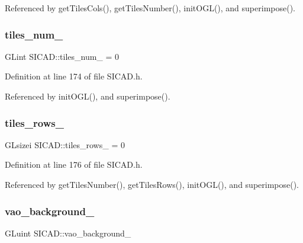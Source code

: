Referenced by get\+Tiles\+Cols(), get\+Tiles\+Number(), init\+O\+G\+L(), and superimpose().

\mbox{\label{classSICAD_a68723ee57cc9a1e02bc0dbda54a584ff}} 
\subsubsection{\texorpdfstring{tiles\+\_\+num\+\_\+}{tiles\_num\_}}
{\footnotesize\ttfamily G\+Lint S\+I\+C\+A\+D\+::tiles\+\_\+num\+\_\+ = 0\hspace{0.3cm}{\ttfamily [private]}}



Definition at line 174 of file S\+I\+C\+A\+D.\+h.



Referenced by init\+O\+G\+L(), and superimpose().

\mbox{\label{classSICAD_aca3efa8f3fb75b3ee02474d4ec00e49e}} 
\subsubsection{\texorpdfstring{tiles\+\_\+rows\+\_\+}{tiles\_rows\_}}
{\footnotesize\ttfamily G\+Lsizei S\+I\+C\+A\+D\+::tiles\+\_\+rows\+\_\+ = 0\hspace{0.3cm}{\ttfamily [private]}}



Definition at line 176 of file S\+I\+C\+A\+D.\+h.



Referenced by get\+Tiles\+Number(), get\+Tiles\+Rows(), init\+O\+G\+L(), and superimpose().

\mbox{\label{classSICAD_a19306fe768bae547e18a3b9366e37389}} 
\subsubsection{\texorpdfstring{vao\+\_\+background\+\_\+}{vao\_background\_}}
{\footnotesize\ttfamily G\+Luint S\+I\+C\+A\+D\+::vao\+\_\+background\+\_\+\hspace{0.3cm}{\ttfamily [private]}}



